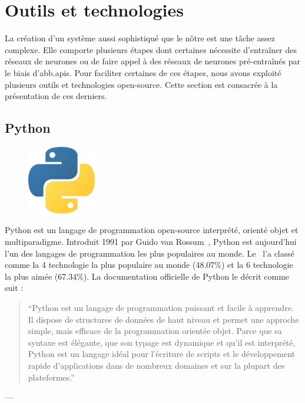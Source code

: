 \section{Outils et technologies}
\label{sec.tech}

La création d'un système aussi sophistiqué que le nôtre est une tâche assez complexe.
Elle comporte plusieurs étapes dont certaines nécessite d'entraîner des réseaux de neurones 
ou de faire appel à des réseaux de neurones pré-entraînés par le biais d'\glspl{abb.api}.
Pour faciliter certaines de ces étapes, nous avons exploité plusieurs outils et technologies open-source.
Cette section est consacrée à la présentation de ces derniers.

\subsection{Python}
\label{subsec.python}

\begin{figure}
    \vspace*{-\topsep}
    \centering
    \includegraphics[width=3cm]{assets/images/python-logo.png}
\end{figure}
Python est un langage de programmation open-source interprété, orienté objet et multiparadigme.
Introduit 1991 par Guido van Rossum~\cite{Python_2022},
Python est aujourd'hui l'un des langages de programmation les plus populaires au monde.
Le~\cite{StackOverflowSurvey2022} l'a classé comme la 4\ieme{} technologie la plus populaire au monde (48.07\%)
et la 6\ieme{} technologie la plus aimée (67.34\%).
La documentation officielle de Python le décrit comme suit :

\begin{quote}
    ``Python est un langage de programmation puissant et facile à apprendre. 
    Il dispose de structures de données de haut niveau 
    et permet une approche simple, mais efficace de la programmation orientée objet. 
    Parce que sa syntaxe est élégante, que son typage est dynamique et qu'il est interprété, 
    Python est un langage idéal pour l'écriture de scripts 
    et le développement rapide d'applications dans de nombreux domaines et sur la plupart des plateformes.''
\end{quote}
\begin{flushright}
    --- 
\end{flushright}

